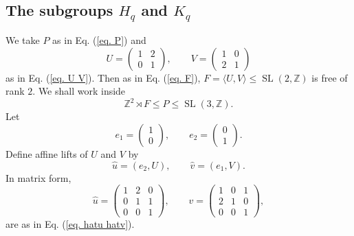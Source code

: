 \documentclass[]{amsart}
\newtheorem*{fixed point criterion}{\fixed point criterion}
\theoremstyle{definition}
\theoremstyle{remark}
\numberwithin{equation}{section}
\newcommand{\SL}{\operatorname{SL}}
\newcommand{\Z}{\mathbb Z}
\begin{document}
\subsection{The subgroups $H_q$ and $K_q$}
We take $P$ as in Eq. (\ref{eq. P}) and
\[
U=\begin{pmatrix}1&2\\0&1\end{pmatrix},
\qquad
V=\begin{pmatrix}1&0\\2&1\end{pmatrix}
\]
as in Eq. (\ref{eq. U V}). Then as in Eq. (\ref{eq. F}), $ F=\langle U,V\rangle\leq \SL(2,\Z)$ is free of rank $2$.  We shall work inside
\[
\Z^2\rtimes F\leq P\leq \SL(3,\Z).
\]
Let
\[
e_1=\begin{pmatrix}1\\0\end{pmatrix},
\qquad
 e_2=\begin{pmatrix}0\\1\end{pmatrix}.
\]
Define affine lifts of $U$ and $V$ by
\[
\hat u=(e_2,U),
\qquad
\hat v=(e_1,V).
\]
In matrix form,
\[
\hat u=
\begin{pmatrix}
1&2&0\\
0&1&1\\
0&0&1
\end{pmatrix},
\qquad
\hat v=
\begin{pmatrix}
1&0&1\\
2&1&0\\
0&0&1
\end{pmatrix},
\]
are as in Eq. (\ref{eq. hatu hatv}). 
\end{document}
